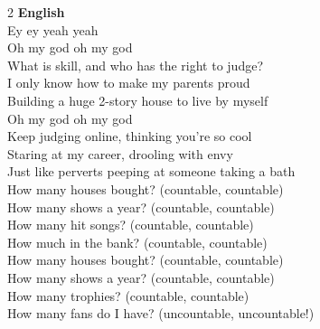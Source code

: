\begin{multicols*}{2}
\textbf{English} \\
\vspace{0.3em}
Ey ey yeah yeah \\
Oh my god oh my god \\
What is skill, and who has the right to judge? \\
I only know how to make my parents proud \\
Building a huge 2-story house to live by myself \\
Oh my god oh my god \\
Keep judging online, thinking you're so cool \\
Staring at my career, drooling with envy \\
Just like perverts peeping at someone taking a bath \\
How many houses bought? (countable, countable) \\
How many shows a year? (countable, countable) \\
How many hit songs? (countable, countable) \\
How much in the bank? (countable, countable) \\
How many houses bought? (countable, countable) \\
How many shows a year? (countable, countable) \\
How many trophies? (countable, countable) \\
How many fans do I have? (uncountable, uncountable!)

\end{multicols*}
\newpage